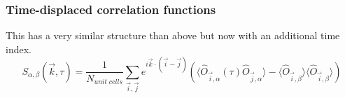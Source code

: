 \subsubsection{Time-displaced correlation functions}

This has a very similar structure than above but now with an additional time index.
\begin{equation}
	S_{\alpha,\beta}(\vec{k},\tau) = \frac{1}{N_{unit \;  cells}} \sum_{\vec{i},\vec{j}} e^{i \vec{k}\cdot (\vec{i} -  \vec{j} ) } \left( \langle \hat{O}_{\vec{i},\alpha} (\tau) \hat{O}_{\vec{j},\alpha} \rangle  - 
	  \langle \hat{O}_{\vec{i},\beta} \rangle \langle   \hat{O}_{\vec{i},\beta}  \rangle \right) 
\end{equation}









